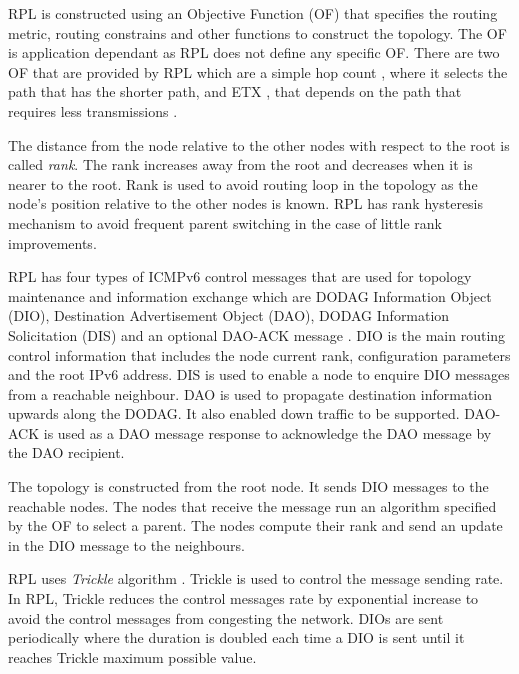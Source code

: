 RPL is constructed using an Objective Function (OF) that specifies the routing metric, routing constrains and other functions to construct the topology. The OF is application dependant as RPL does not define any specific OF. There are two OF that are provided by RPL which are a simple hop count \cite{of0}, where it selects the path that has the shorter path, and ETX \cite{mrhof}, that depends on the path that requires less transmissions \cite{routingmetrics, tsiftes_framework_2010, tsvetkov2011rpl}.

The distance from the node relative to the other nodes with respect to the root is called \textit{rank}. The rank increases away from the root and decreases when it is nearer to the root. Rank is used to avoid routing loop in the topology as the node's position relative to the other nodes is known. RPL has rank hysteresis mechanism to avoid frequent parent switching in the case of little rank improvements.

RPL has four types of ICMPv6 control messages that are used for topology maintenance and information exchange which are DODAG Information Object (DIO), Destination Advertisement Object (DAO), DODAG Information Solicitation (DIS) and an optional DAO-ACK message \cite{winter2012rpl}. DIO is the main routing control information that includes the node current rank, configuration parameters and the root IPv6 address. DIS is used to enable a node to enquire DIO messages from a reachable neighbour. DAO is used to propagate destination information upwards along the DODAG. It also enabled down traffic to be supported. DAO-ACK is used as a DAO message response to acknowledge the DAO message by the DAO recipient.  

The topology is constructed from the root node. It sends DIO messages to the reachable nodes. The nodes that receive the message run an algorithm specified by the OF to select a parent. The nodes compute their rank and send an update in the DIO message to the neighbours. 

RPL uses \textit{Trickle} algorithm \cite{trickle}. Trickle is used to control the message sending rate. In RPL, Trickle reduces the control messages rate by exponential increase to avoid the control messages from congesting the network. DIOs are sent periodically where the duration is doubled each time a DIO is sent until it reaches Trickle maximum possible value.


